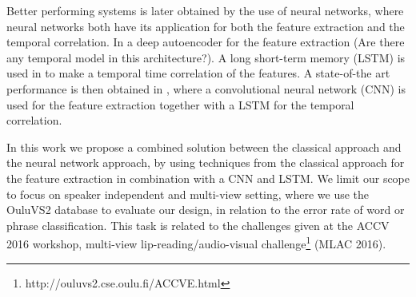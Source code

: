Better performing systems is later obtained by the use of neural networks, where neural networks both have its application for both the feature extraction and the temporal correlation.
In \cite{Ngiam2011} a deep autoencoder for the feature extraction (Are there any temporal model in this architecture?).
A long short-term memory (LSTM) is used in \cite{Wand2016} to make a temporal time correlation of the features.
A state-of-the art performance is then obtained in \cite{Lee}, where a convolutional neural network (CNN) is used for the feature extraction together with a LSTM for the temporal correlation.

In this work we propose a combined solution between the classical approach and the neural network approach, by using techniques from the classical approach for the feature extraction in combination with a CNN and LSTM.
We limit our scope to focus on speaker independent and multi-view setting, where we use the OuluVS2 database\cite{Anina2015} to evaluate our design, in relation to the error rate of word or phrase classification.
This task is related to the challenges given at the ACCV 2016 workshop, multi-view lip-reading/audio-visual challenge\footnote{http://ouluvs2.cse.oulu.fi/ACCVE.html} (MLAC 2016).
